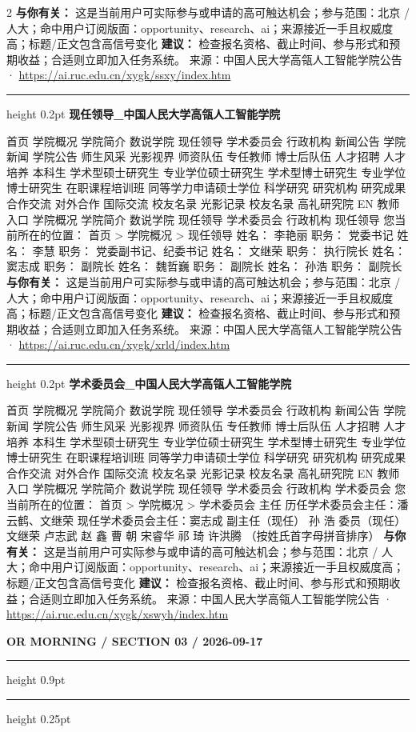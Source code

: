\documentclass[10.5pt]{ctexart}
\begin{document}
\begin{multicols}{2}
\textbf{与你有关：} 这是当前用户可实际参与或申请的高可触达机会；参与范围：北京 / 人大；命中用户订阅版面：opportunity、research、ai；来源接近一手且权威度高；标题/正文包含高信号变化
\textbf{建议：} 检查报名资格、截止时间、参与形式和预期收益；合适则立即加入任务系统。
{\footnotesize\color{ormuted} 来源：中国人民大学高瓴人工智能学院公告 · \url{https://ai.ruc.edu.cn/xygk/ssxy/index.htm}}
\vspace{2mm}
\hrule height 0.2pt
\vspace{2mm}
{\large\bfseries 现任领导\_中国人民大学高瓴人工智能学院}\par
首页 学院概况 学院简介 数说学院 现任领导 学术委员会 行政机构 新闻公告 学院新闻 学院公告 师生风采 光影视界 师资队伍 专任教师 博士后队伍 人才招聘 人才培养 本科生 学术型硕士研究生 专业学位硕士研究生 学术型博士研究生 专业学位博士研究生 在职课程培训班 同等学力申请硕士学位 科学研究 研究机构 研究成果 合作交流 对外合作 国际交流 校友名录 光影记录 校友名录 高礼研究院 EN 教师入口 学院概况 学院简介 数说学院 现任领导 学术委员会 行政机构 现任领导 您当前所在的位置： 首页 > 学院概况 > 现任领导 姓名： 李艳丽 职务： 党委书记 姓名： 李慧 职务： 党委副书记、纪委书记 姓名： 文继荣 职务： 执行院长 姓名： 窦志成 职务： 副院长 姓名： 魏哲巍 职务： 副院长 姓名： 孙浩 职务： 副院长
\textbf{与你有关：} 这是当前用户可实际参与或申请的高可触达机会；参与范围：北京 / 人大；命中用户订阅版面：opportunity、research、ai；来源接近一手且权威度高；标题/正文包含高信号变化
\textbf{建议：} 检查报名资格、截止时间、参与形式和预期收益；合适则立即加入任务系统。
{\footnotesize\color{ormuted} 来源：中国人民大学高瓴人工智能学院公告 · \url{https://ai.ruc.edu.cn/xygk/xrld/index.htm}}
\vspace{2mm}
\hrule height 0.2pt
\vspace{2mm}
{\large\bfseries 学术委员会\_中国人民大学高瓴人工智能学院}\par
首页 学院概况 学院简介 数说学院 现任领导 学术委员会 行政机构 新闻公告 学院新闻 学院公告 师生风采 光影视界 师资队伍 专任教师 博士后队伍 人才招聘 人才培养 本科生 学术型硕士研究生 专业学位硕士研究生 学术型博士研究生 专业学位博士研究生 在职课程培训班 同等学力申请硕士学位 科学研究 研究机构 研究成果 合作交流 对外合作 国际交流 校友名录 光影记录 校友名录 高礼研究院 EN 教师入口 学院概况 学院简介 数说学院 现任领导 学术委员会 行政机构 学术委员会 您当前所在的位置： 首页 > 学院概况 > 学术委员会 主任 历任学术委员会主任：潘云鹤、文继荣 现任学术委员会主任：窦志成 副主任（现任） 孙 浩 委员（现任） 文继荣 卢志武 赵 鑫 曹 朝 宋睿华 祁 琦 许洪腾 （按姓氏首字母拼音排序）
\textbf{与你有关：} 这是当前用户可实际参与或申请的高可触达机会；参与范围：北京 / 人大；命中用户订阅版面：opportunity、research、ai；来源接近一手且权威度高；标题/正文包含高信号变化
\textbf{建议：} 检查报名资格、截止时间、参与形式和预期收益；合适则立即加入任务系统。
{\footnotesize\color{ormuted} 来源：中国人民大学高瓴人工智能学院公告 · \url{https://ai.ruc.edu.cn/xygk/xswyh/index.htm}}
\end{multicols}
\newpage
{\small\bfseries OR MORNING / SECTION 03 / 2026-09-17}
\vspace{2mm}
\hrule height 0.9pt
\vspace{1.5mm}
\hrule height 0.25pt
\vspace{4mm}
\end{document}
